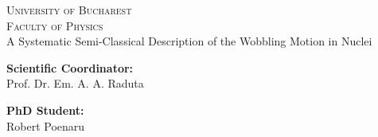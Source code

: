 \documentclass[12pt]{report}
\begin{document}

\begin{titlepage}
\begin{center}
    \textsc{ \LARGE{University of Bucharest \\}}
	\textsc{ \LARGE{Faculty of Physics\\ }}
	\vspace{30mm}
	\fontsize{9mm}{7mm}\selectfont 
    \textup{A Systematic Semi-Classical Description of the Wobbling Motion in Nuclei}
\end{center}

\vspace{25mm}

\begin{minipage}[t]{0.47\textwidth}
	\textnormal{\large{\bf Scientific Coordinator:\\}}
	{\large Prof. Dr. Em. A. A. Raduta}
\end{minipage}\hfill\begin{minipage}[t]{0.47\textwidth}\raggedleft
	\textnormal{\large{\bf PhD Student:\\}}
	{\large Robert Poenaru}
\end{minipage}

\vspace{40mm}


\vspace{30mm}

\centering{\large{\today}}
\end{titlepage}
\end{document}
